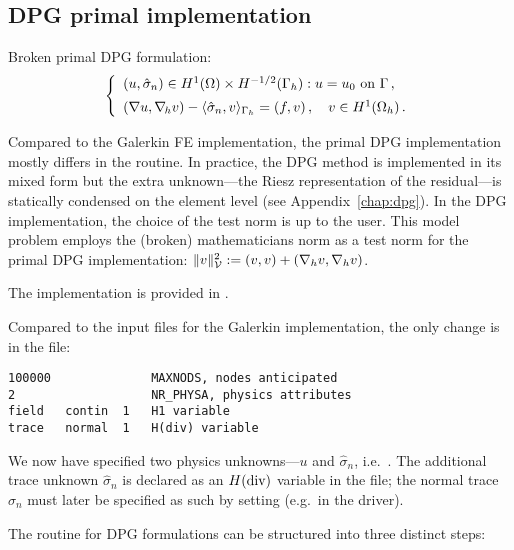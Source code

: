 \subsection{DPG primal implementation}
\label{sec:poisson-primal}

Broken primal DPG formulation:
\[
\left\{
\begin{array}{llll}
	(u, \hat \sigma_n) \in H^1(\Omega) \times H^{-1/2}(\Gamma_h): u = u_0 \text{ on } \Gamma \, , \\[5pt]
	(\nabla u, \nabla_{\hskip -1pt h} v) - \langle \hat \sigma_n , v \rangle_{\Gamma_h} 
	= (f,v) \, ,\quad v \in H^1(\Omega_h) \, .
\end{array}
\right.
\]

Compared to the Galerkin FE implementation, the primal DPG implementation mostly differs in the  routine. In practice, the DPG method is implemented in its mixed form \cite{demkowicz2017dpg} but the extra unknown---the Riesz representation of the residual---is statically condensed on the element level (see Appendix~\ref{chap:dpg}). In the DPG implementation, the choice of the test norm is up to the user. This model problem employs the (broken) mathematicians norm as a test norm for the primal DPG implementation: $\| v \|^2_{\mathcal{V}} := (v,v) + (\nabla_h v, \nabla_h v)$.

The implementation is provided in .

Compared to the input files for the Galerkin implementation, the only change is in the  file:
\begin{lstlisting}[caption=\file{POISSON/PRIMAL\_DPG/input/physics} input file.]
100000              MAXNODS, nodes anticipated
2                   NR_PHYSA, physics attributes
field   contin  1   H1 variable
trace   normal  1   H(div) variable
\end{lstlisting}
We now have specified two physics unknowns---$u$ and $\hat \sigma_n$, i.e.~. The additional trace unknown $\hat \sigma_n$ is declared as an $H(\text{div})$ variable in the  file; the normal trace $\hat \sigma_n$ must later be specified as such by setting  (e.g.~in the  driver).

The  routine for DPG formulations can be structured into three distinct steps:
\vskip 5pt

